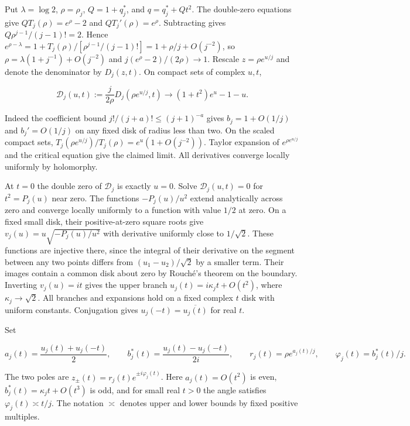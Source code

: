 \documentclass[11pt]{article}
\begin{document}
Put \(\lambda=\log 2\), \(\rho=\rho_j\), \(Q=1+q_j^*\), and \(q=q_j^*+Qt^2\). The double-zero equations give \(QT_j(\rho)=e^\rho-2\) and \(QT_j'(\rho)=e^\rho\). Subtracting gives \(Q\rho^{j-1}/(j-1)!=2\). Hence \(e^{\rho-\lambda}=1+T_j(\rho)/[\rho^{j-1}/(j-1)!]=1+\rho/j+O(j^{-2})\), so \(\rho=\lambda(1+j^{-1})+O(j^{-2})\) and \(j(e^\rho-2)/(2\rho)\to1\). Rescale \(z=\rho e^{u/j}\) and denote the denominator by \(D_j(z,t)\). On compact sets of complex \(u,t\),

\begin{equation*}
\mathcal D_j(u,t):=\frac{j}{2\rho}D_j(\rho e^{u/j},t)
\longrightarrow (1+t^2)e^u-1-u .
\end{equation*}

Indeed the coefficient bound \(j!/(j+a)!\le(j+1)^{-a}\) gives \(b_j=1+O(1/j)\) and \(b_j'=O(1/j)\) on any fixed disk of radius less than two. On the scaled compact sets, \(T_j(\rho e^{u/j})/T_j(\rho)=e^u(1+O(j^{-2}))\). Taylor expansion of \(e^{\rho e^{u/j}}\) and the critical equation give the claimed limit. All derivatives converge locally uniformly by holomorphy.

At \(t=0\) the double zero of \(\mathcal D_j\) is exactly \(u=0\). Solve \(\mathcal D_j(u,t)=0\) for \(t^2=P_j(u)\) near zero. The functions \(-P_j(u)/u^2\) extend analytically across zero and converge locally uniformly to a function with value \(1/2\) at zero. On a fixed small disk, their positive-at-zero square roots give \(v_j(u)=u\sqrt{-P_j(u)/u^2}\) with derivative uniformly close to \(1/\sqrt2\). These functions are injective there, since the integral of their derivative on the segment between any two points differs from \((u_1-u_2)/\sqrt2\) by a smaller term. Their images contain a common disk about zero by Rouché's theorem on the boundary. Inverting \(v_j(u)=it\) gives the upper branch \(u_j(t)=i\kappa_j t+O(t^2)\), where \(\kappa_j\to\sqrt2\). All branches and expansions hold on a fixed complex \(t\) disk with uniform constants. Conjugation gives \(u_j(-t)=\overline{u_j(t)}\) for real \(t\).

Set

\begin{equation*}
a_j(t)=\frac{u_j(t)+u_j(-t)}2,\qquad b_j^{\ast}(t)=\frac{u_j(t)-u_j(-t)}{2i},\qquad
r_j(t)=\rho e^{a_j(t)/j},\qquad \varphi_j(t)=b_j^{\ast}(t)/j.
\end{equation*}

The two poles are \(z_\pm(t)=r_j(t)e^{\pm i\varphi_j(t)}\). Here \(a_j(t)=O(t^2)\) is even, \(b_j^*(t)=\kappa_j t+O(t^3)\) is odd, and for small real \(t>0\) the angle satisfies \(\varphi_j(t)\asymp t/j\). The notation \(\asymp\) denotes upper and lower bounds by fixed positive multiples.
\end{document}
